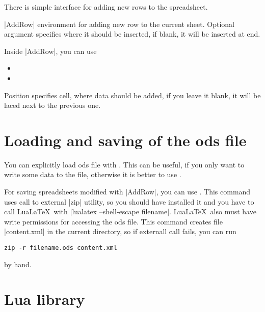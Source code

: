 \documentclass{ltxdoc}
\newcommand\ods{\textsf{ods}\xspace}
\begin{document}
There is simple interface for adding new rows to the spreadsheet.

|AddRow| environment for adding new row to the current sheet. Optional argument  specifies where it should be inserted, if blank, it will be inserted at end.

Inside |AddRow|, you can use 
\begin{itemize}
	\item \cmd{\AddString} 
	\item \cmd{\AddNumber}
\end{itemize} 
Position specifies cell, where data should be added, if you leave it blank, it will be laced next to the previous one.

\begin{LTXexample}
\begin{AddRow}
\end{AddRow} 
\begin{AddRow}[3]
\end{AddRow} 
\end{LTXexample}

\section{Loading and saving of the \ods file}

You can explicitly load \ods file with \marginpar{\cmd{\loadodsfile}}\cmd{\loadodsfile}. This can be useful, if you only want to write some data to the file, otherwise it is better to use .

For saving spreadsheets modified with |AddRow|, you can use \cmd{\savespreadsheet}\marginpar{\cmd{\savespreadsheet}}. This command uses call to external |zip| utility, so you should have installed it and you have to call Lua\LaTeX\ with |lualatex --shell-escape filename|. Lua\LaTeX\ also must have write permissions for accessing the \ods file. This command creates file |content.xml| in the current directory, so if externall call fails, you can run
\begin{verbatim}
zip -r filename.ods content.xml
\end{verbatim} 
by hand.
\section{Lua library}
\end{document}
